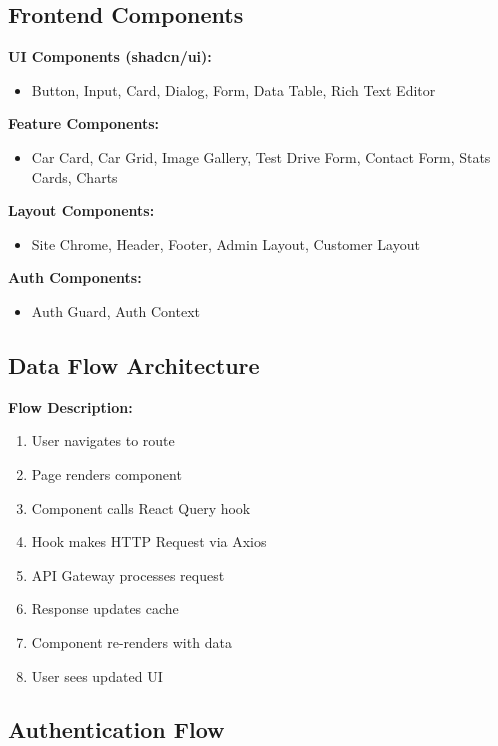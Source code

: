 \documentclass[12pt,a4paper]{article}
\begin{document}
\subsection{Frontend Components}

\bigskip
\noindent\textbf{UI Components (shadcn/ui):}
\begin{itemize}
    \item Button, Input, Card, Dialog, Form, Data Table, Rich Text Editor
\end{itemize}

\noindent\textbf{Feature Components:}
\begin{itemize}
    \item Car Card, Car Grid, Image Gallery, Test Drive Form, Contact Form, Stats Cards, Charts
\end{itemize}

\noindent\textbf{Layout Components:}
\begin{itemize}
    \item Site Chrome, Header, Footer, Admin Layout, Customer Layout
\end{itemize}

\noindent\textbf{Auth Components:}
\begin{itemize}
    \item Auth Guard, Auth Context
\end{itemize}

\subsection{Data Flow Architecture}

\bigskip
\noindent\textbf{Flow Description:}
\begin{enumerate}
    \item User navigates to route
    \item Page renders component
    \item Component calls React Query hook
    \item Hook makes HTTP Request via Axios
    \item API Gateway processes request
    \item Response updates cache
    \item Component re-renders with data
    \item User sees updated UI
\end{enumerate}

\subsection{Authentication Flow}
\end{document}
